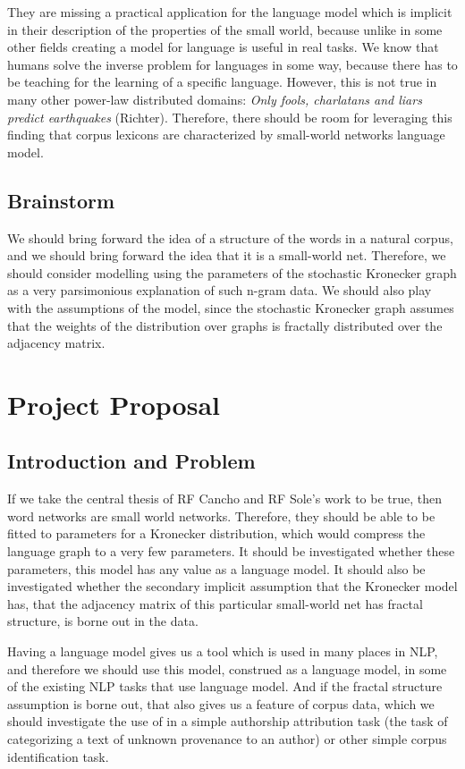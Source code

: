 \documentclass[12pt]{article}
\begin{document}
They are missing a practical application for the language model which is implicit in their description of the properties of the small world, because unlike in some other fields creating a model for language is useful in real tasks. We know that humans solve the inverse problem for languages in some way, because there has to be teaching for the learning of a specific language. However, this is not true in many other power-law distributed domains: \emph{Only fools, charlatans and liars predict earthquakes} (Richter). Therefore, there should be room for leveraging this finding that corpus lexicons are characterized by small-world networks language model. %

\subsection{Brainstorm}

We should bring forward the idea of a structure of the words in a natural corpus, and we should bring forward the idea that it is a small-world net. Therefore, we should consider modelling using the parameters of the stochastic Kronecker graph as a very parsimonious explanation of such n-gram data. We should also play with the assumptions of the model, since the stochastic Kronecker graph assumes that the weights of the distribution over graphs is fractally distributed over the adjacency matrix.

\section{Project Proposal}

\subsection{Introduction and Problem}
If we take the central thesis of RF Cancho and RF Sole's work to be true, then word networks are small world networks. Therefore, they should be able to be fitted to parameters for a Kronecker distribution, which would compress the language graph to a very few parameters. It should be investigated whether these parameters, this model has any value as a language model. It should also be investigated whether the secondary implicit assumption that the Kronecker model has, that the adjacency matrix of this particular small-world net has fractal structure, is borne out in the data.

Having a language model gives us a tool which is used in many places in NLP, and therefore we should use this model, construed as a language model, in some of the existing NLP tasks that use language model. And if the fractal structure assumption is borne out, that also gives us a feature of corpus data, which we should investigate the use of in a simple authorship attribution task (the task of categorizing a text of unknown provenance to an author) or other simple corpus identification task.
\end{document}
